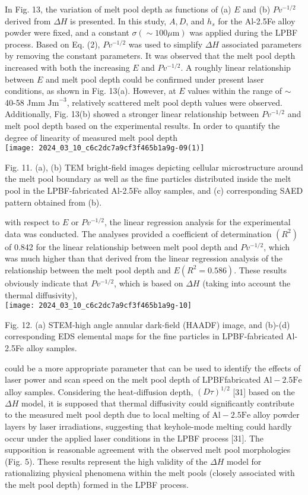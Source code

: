 \documentclass[10pt]{article}
\begin{document}
In Fig. 13, the variation of melt pool depth as functions of (a) $E$ and (b) $P v^{-1 / 2}$ derived from $\Delta H$ is presented. In this study, $A, D$, and $h_{s}$ for the Al-2.5Fe alloy powder were fixed, and a constant $\sigma(\sim 100 \mu \mathrm{m})$ was applied during the LPBF process. Based on Eq. (2), $P v^{-1 / 2}$ was used to simplify $\Delta H$ associated parameters by removing the constant parameters. It was observed that the melt pool depth increased with both the increasing $E$ and $P v^{-1 / 2}$. A roughly linear relationship between $E$ and melt pool depth could be confirmed under present laser conditions, as shown in Fig. 13(a). However, at $E$ values within the range of $\sim$ 40-58 Jmm $\mathrm{Jm}^{-3}$, relatively scattered melt pool depth values were observed. Additionally, Fig. 13(b) showed a stronger linear relationship between $P v^{-1 / 2}$ and melt pool depth based on the experimental results. In order to quantify the degree of linearity of measured melt pool depth\\
\texttt{[image: 2024\_03\_10\_c6c2dc7a9cf3f465b1a9g-09(1)]}

Fig. 11. (a), (b) TEM bright-field images depicting cellular microstructure around the melt pool boundary as well as the fine particles distributed inside the melt pool in the LPBF-fabricated Al-2.5Fe alloy samples, and (c) corresponding SAED pattern obtained from (b).

with respect to $E$ or $P v^{-1 / 2}$, the linear regression analysis for the experimental data was conducted. The analyses provided a coefficient of determination $\left(R^{2}\right)$ of 0.842 for the linear relationship between melt pool depth and $P v^{-1 / 2}$, which was much higher than that derived from the linear regression analysis of the relationship between the melt pool depth and $E\left(R^{2}=0.586\right)$. These results obviously indicate that $P v^{-1 / 2}$, which is based on $\Delta H$ (taking into account the thermal diffusivity),\\
\texttt{[image: 2024\_03\_10\_c6c2dc7a9cf3f465b1a9g-10]}

Fig. 12. (a) STEM-high angle annular dark-field (HAADF) image, and (b)-(d) corresponding EDS elemental maps for the fine particles in LPBF-fabricated Al-2.5Fe alloy samples.

could be a more appropriate parameter that can be used to identify the effects of laser power and scan speed on the melt pool depth of LPBFfabricated $\mathrm{Al}-2.5 \mathrm{Fe}$ alloy samples. Considering the heat-diffusion depth, $(D \tau)^{1 / 2}$ [31] based on the $\Delta H$ model, it is supposed that thermal diffusivity could significantly contribute to the measured melt pool depth due to local melting of $\mathrm{Al}-2.5 \mathrm{Fe}$ alloy powder layers by laser irradiations, suggesting that keyhole-mode melting could hardly occur under the applied laser conditions in the LPBF process [31]. The supposition is reasonable agreement with the observed melt pool morphologies (Fig. 5). These results represent the high validity of the $\Delta H$ model for rationalizing physical phenomena within the melt pools (closely associated with the melt pool depth) formed in the LPBF process.
\end{document}

